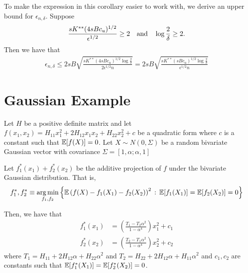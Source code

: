 \documentclass[12pt,pdftex,aos,noinfoline,addressasfootnote]{imsart}
\begin{document}
To make the expression in this corollary easier to work with, we derive an upper bound for $\epsilon_{n, \delta}$. Suppose 
\begin{align}
\frac{ sK^{**} (4sBc_u)^{1/2}}{\epsilon^{1/2}} \geq 2 \quad \textrm{and} \quad \log \frac{2}{\delta} \geq 2 \label{cond:simplify_covering_number}.
\end{align}
Then we have that
\begin{align*}
\epsilon_{n,\delta} \leq 2sB \sqrt{ \frac{ sK^{**} (4 sBc_u)^{1/2} \log \frac{2}{\delta}}{2\epsilon^{1/2}n}} = 2sB \sqrt{ \frac{sK^{**} (sBc_u)^{1/2} \log \frac{2}{\delta}}{\epsilon^{1/2} n}}
\end{align*}

\section{Gaussian Example}
\label{sec:gaussian_example}

Let $H$ be a positive definite matrix and let $f(x_1, x_2) = H_{11} x_1^2 + 2H_{12} x_1x_2 + H_{22} x_2^2 + c$ be a quadratic form where $c$ is a constant such that ${\mathbb E}[f(X)] = 0$. Let $X \sim N(0, \Sigma)$ be a random bivariate Gaussian vector with covariance $\Sigma = [1, \alpha; \alpha, 1]$ 

\begin{proposition}
Let $f^*_1(x_1) + f^*_2(x_2)$ be the additive projection of $f$ under the bivariate Gaussian distribution. That is,
\begin{align*} 
f^*_1, f^*_2 \equiv \mathop{\text{\rm arg\,min}}_{f_1, f_2} \Big\{ {\mathbb E} \left(f(X) - f_1(X_1) - f_2(X_2)\right)^2 \,:\, {\mathbb E}[f_1(X_1)] = {\mathbb E}[f_2(X_2)] = 0 \Big\}
\end{align*}

Then, we have that 
\begin{align*}
f^*_1(x_1) &= \left( \frac{T_1 - T_2 \alpha^2}{1 - \alpha^4} \right) x_1^2 + c_1 \\
f^*_2(x_2) &= \left( \frac{T_2 - T_1\alpha^2}{1 - \alpha^4} \right) x_2^2 + c_2
\end{align*}
where $T_1 = H_{11} + 2H_{12} \alpha + H_{22} \alpha^2$ and $T_2 = H_{22} + 2H_{12} \alpha + H_{11} \alpha^2$ and $c_1,c_2$ are constants such that ${\mathbb E}[f_1^*(X_1)] = {\mathbb E}[f_2^*(X_2)] = 0$.
\end{proposition}
\end{document}
